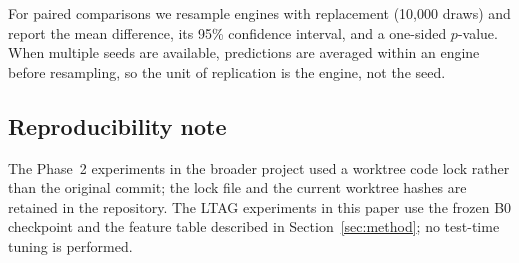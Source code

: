 For paired comparisons we resample engines with replacement (10{,}000 draws) and
report the mean difference, its 95\% confidence interval, and a one-sided
$p$-value. When multiple seeds are available, predictions are averaged within an
engine before resampling, so the unit of replication is the engine, not the seed.

\subsection{Reproducibility note}

The Phase~2 experiments in the broader project used a worktree code lock rather
than the original commit; the lock file and the current worktree hashes are
retained in the repository. The LTAG experiments in this paper use the frozen
B0 checkpoint and the feature table described in Section~\ref{sec:method}; no
test-time tuning is performed.
